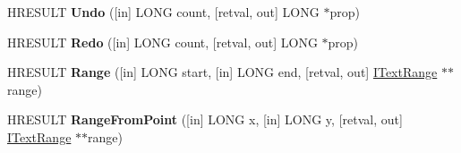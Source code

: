 \begin{DoxyCompactItemize}
H\+R\+E\+S\+U\+LT {\bfseries Undo} (\mbox{[}in\mbox{]} L\+O\+NG count, \mbox{[}retval, out\mbox{]} L\+O\+NG $\ast$prop)
\item 
\mbox{\label{interfacetom_1_1_i_text_document_a40dfee44c282b27f709d26db995ae279}} 
H\+R\+E\+S\+U\+LT {\bfseries Redo} (\mbox{[}in\mbox{]} L\+O\+NG count, \mbox{[}retval, out\mbox{]} L\+O\+NG $\ast$prop)
\item 
\mbox{\label{interfacetom_1_1_i_text_document_a5f182f6d661e60465caed15d89ef20ff}} 
H\+R\+E\+S\+U\+LT {\bfseries Range} (\mbox{[}in\mbox{]} L\+O\+NG start, \mbox{[}in\mbox{]} L\+O\+NG end, \mbox{[}retval, out\mbox{]} \hyperlink{interfacetom_1_1_i_text_range}{I\+Text\+Range} $\ast$$\ast$range)
\item 
\mbox{\label{interfacetom_1_1_i_text_document_a38f57c4219892765f2823c91dcb215f7}} 
H\+R\+E\+S\+U\+LT {\bfseries Range\+From\+Point} (\mbox{[}in\mbox{]} L\+O\+NG x, \mbox{[}in\mbox{]} L\+O\+NG y, \mbox{[}retval, out\mbox{]} \hyperlink{interfacetom_1_1_i_text_range}{I\+Text\+Range} $\ast$$\ast$range)
\end{DoxyCompactItemize}
